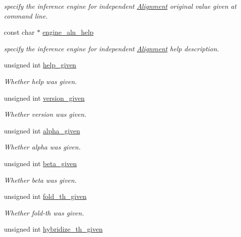 \begin{DoxyCompactItemize}
\begin{DoxyCompactList}\small\item\em specify the inference engine for independent \hyperlink{class_alignment}{Alignment} original value given at command line. \end{DoxyCompactList}\item 
const char $\ast$ \hyperlink{structgengetopt__args__info_ac82fc1aba0c9785c9484b68abe875fba}{engine\+\_\+aln\+\_\+help}
\begin{DoxyCompactList}\small\item\em specify the inference engine for independent \hyperlink{class_alignment}{Alignment} help description. \end{DoxyCompactList}\item 
unsigned int \hyperlink{structgengetopt__args__info_ab9fd677f890731fd7d6f6c62e6dfc99c}{help\+\_\+given}
\begin{DoxyCompactList}\small\item\em Whether help was given. \end{DoxyCompactList}\item 
unsigned int \hyperlink{structgengetopt__args__info_ad4953a2130b2f8b94a3a687014f278e1}{version\+\_\+given}
\begin{DoxyCompactList}\small\item\em Whether version was given. \end{DoxyCompactList}\item 
unsigned int \hyperlink{structgengetopt__args__info_a2843ef7fb6a39e43eccc1088e4d63f6f}{alpha\+\_\+given}
\begin{DoxyCompactList}\small\item\em Whether alpha was given. \end{DoxyCompactList}\item 
unsigned int \hyperlink{structgengetopt__args__info_a78fbc9190ccaddb0718c66b5ea3f16d1}{beta\+\_\+given}
\begin{DoxyCompactList}\small\item\em Whether beta was given. \end{DoxyCompactList}\item 
unsigned int \hyperlink{structgengetopt__args__info_a0a5f7a2dde96bfe36799ed2d38282f75}{fold\+\_\+th\+\_\+given}
\begin{DoxyCompactList}\small\item\em Whether fold-\/th was given. \end{DoxyCompactList}\item 
unsigned int \hyperlink{structgengetopt__args__info_a8cfc0b8596b61b015d998df7255326a2}{hybridize\+\_\+th\+\_\+given}

\end{DoxyCompactItemize}
